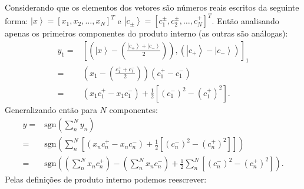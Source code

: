 Considerando que os elementos dos vetores são números reais escritos da seguinte forma: $\left|x\right\rangle =\left[x_{1},x_{2},\dots,x_{N}\right]^{T}$ e $\left|c_{\pm}\right\rangle =\left[c_{1}^{\pm},c_{2}^{\pm},\dots,c_{N}^{+}\right]^{T}$. Então analisando apenas os primeiros componentes do produto interno (as outras são análogas):
\begin{equation}
\begin{split}
y_{1}= & \left[\left(\left|x\right\rangle -\left(\frac{\left|c_{+}\right\rangle +\left|c_{-}\right\rangle }{2}\right)\right),\left(\left|c_{+}\right\rangle -\left|c_{-}\right\rangle \right)\right]_{1} \\
=&\left(x_{1}-\left(\frac{c_{1}^{+}+c_{1}^{-}}{2}\right)\right)\left(c_{1}^{+}-c_{1}^{-}\right)\\
=&\left(x_{1}c_{1}^{+}-x_{1}c_{1}^{-}\right)+\frac{1}{2}\left[\left(c_{1}^{-}\right)^{2}-\left(c_{1}^{+}\right)^{2}\right] .
\end{split} 
\end{equation}Generalizando então para $N$  componentes:
\begin{equation}
\begin{split}
y=&\text{sgn}\left(\sum_{n}^{N}y_{n}\right)\\
=&\text{sgn}\left(\sum_{n}^{N}\left[\left(x_{n}c_{n}^{+}-x_{n}c_{n}^{-}\right)+\frac{1}{2}\left[\left(c_{n}^{-}\right)^{2}-\left(c_{n}^{+}\right)^{2}\right]\right]\right)\\
=&\text{sgn}\left(\left(\sum_{n}^{N}x_{n}c_{n}^{+}\right)-\left(\sum_{n}^{N}x_{n}c_{n}^{-}\right)+\frac{1}{2}\sum_{n}^{N}\left[\left(c_{n}^{-}\right)^{2}-\left(c_{n}^{+}\right)^{2}\right]\right).
\end{split} 
\end{equation}
Pelas definições de produto interno podemos reescrever:

